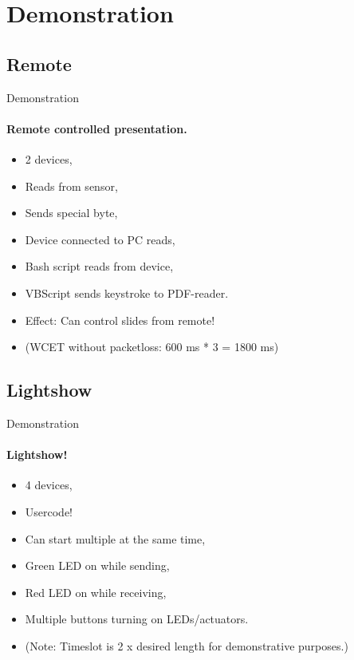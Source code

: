\section{Demonstration}
    \subsection{Remote}
    \begin{frame}[t]{Demonstration}\framesubtitle{Remote controlled presentation.}
        \begin{itemize}
            \item 2 devices,
            \item Reads from sensor,
            \item Sends special byte,
            \item Device connected to PC reads,
            \item Bash script reads from device,
            \item VBScript sends keystroke to PDF-reader.
            \item Effect: Can control slides from remote!
            \item (WCET without packetloss: 600 ms * 3 = 1800 ms)
        \end{itemize}
    \end{frame}
    \subsection{Lightshow}
    \begin{frame}[t]{Demonstration}\framesubtitle{Lightshow!}
        \begin{itemize}
            \item 4 devices,
            \item Usercode!
            \item Can start multiple at the same time,
            \item Green LED on while sending,
            \item Red LED on while receiving,
            \item Multiple buttons turning on LEDs/actuators.
            \item (Note: Timeslot is 2 x desired length for demonstrative purposes.)
        \end{itemize}
    \end{frame}
